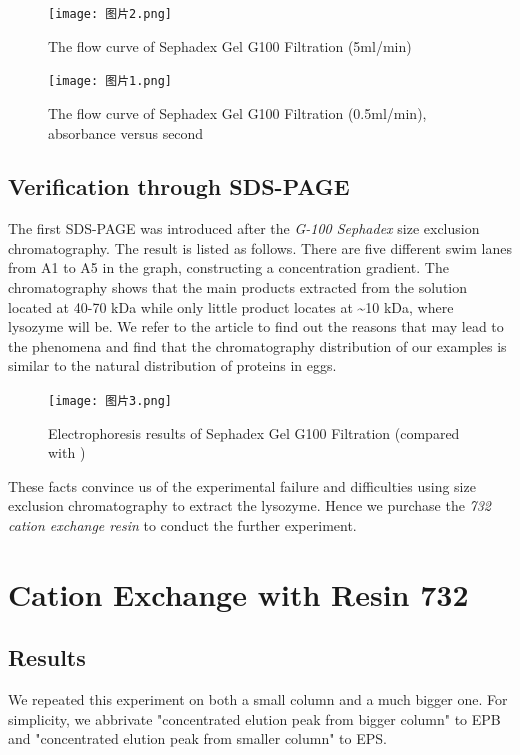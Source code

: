\begin{figure}[!h]
	\centering
	\texttt{[image: 图片2.png]}
	\caption{The flow curve of Sephadex Gel G100 Filtration (5ml/min)}
	\label{fig:g1001}
\end{figure}

\begin{figure}[!h]
	\centering
	\texttt{[image: 图片1.png]}
	\caption{The flow curve of Sephadex Gel G100 Filtration (0.5ml/min), absorbance versus second}
	\label{fig:g1002}
\end{figure}

\subsection{Verification through SDS-PAGE}

The first SDS-PAGE was introduced after the \emph{G-100 Sephadex} size
exclusion chromatography. The result is listed as follows. There are
five different swim lanes from A1 to A5 in the graph, constructing a
concentration gradient. The chromatography shows that the main products
extracted from the solution located at 40-70 kDa while only little
product locates at \textasciitilde{}10 kDa, where lysozyme will be. We refer to the article to find out the reasons that may lead to the phenomena and find that the chromatography distribution of our examples is similar to the natural distribution of proteins in
eggs.

\begin{figure}[!h]
	\centering
	\texttt{[image: 图片3.png]}
	\caption{Electrophoresis results of Sephadex Gel G100 Filtration (compared with \citet{Liu2020})}
	\label{fig:g100}
\end{figure}

These facts convince us of the experimental failure and difficulties
using size exclusion chromatography to extract the lysozyme. Hence we
purchase the \emph{732 cation exchange resin} to conduct the further
experiment.

\section{Cation Exchange with Resin 732}

\subsection{Results}
We repeated this experiment on both a small column and a much bigger one. For simplicity, we abbrivate "concentrated elution peak from bigger column" to EPB and "concentrated elution peak from smaller column" to EPS.

